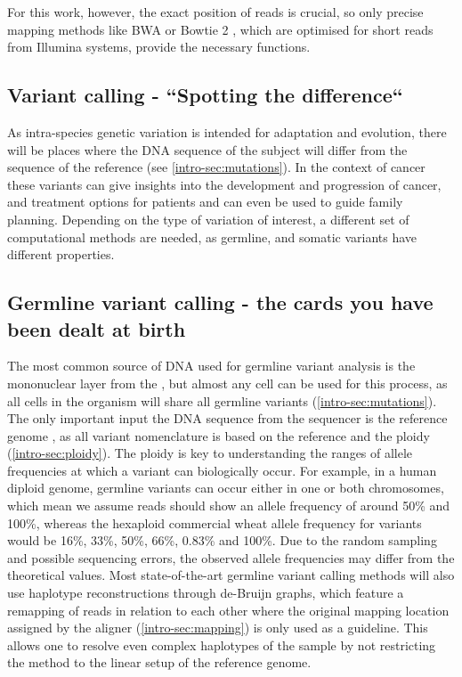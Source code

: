 For this work, however, the exact position of reads is crucial, so only precise mapping methods like BWA \cite{Li2013} or Bowtie 2 \cite{Langmead2018}, which are optimised for short reads from Illumina systems, provide the necessary functions.


\subsection[Variant calling]{Variant calling - ``Spotting the difference``}
\label{intro-sec:variantcalling}
As intra-species genetic variation is intended for adaptation and evolution, there will be places where the DNA sequence of the subject will differ from the sequence of the reference (see \autoref{intro-sec:mutations}). In the context of cancer these variants can give insights into the development and progression of cancer, and treatment options for patients and can even be used to guide family planning. Depending on the type of variation  of interest, a different set of computational methods are needed, as germline, and somatic variants have different properties.

\subsection[Germline]{Germline variant calling - the cards you have been dealt at birth}
\label{intro-sec:germlinecalling}
The most common source of DNA used for germline variant analysis is the mononuclear layer from the , but  almost any cell can be used for this process, as all cells in the organism will share all germline variants (\autoref{intro-sec:mutations}). The only important input  the DNA sequence from the sequencer is the  reference genome , as all variant nomenclature is based on the reference and the ploidy  (\autoref{intro-sec:ploidy}). The ploidy is key to understanding the ranges of allele frequencies at which a variant can biologically occur. For example, in a human diploid genome, germline variants can occur either in one or both chromosomes, which mean we assume reads should show an allele frequency of around 50\% and 100\%, whereas the hexaploid commercial wheat \cite{Mayer2014} allele frequency for variants would be 16\%, 33\%, 50\%, 66\%, 0.83\% and 100\%. Due to the random sampling and possible sequencing errors, the observed allele frequencies may differ from the theoretical values. 
Most state-of-the-art germline variant calling methods will also use haplotype reconstructions through de-Bruijn graphs, which feature a remapping of reads in relation to each other \cite{Garrison2012,Lai2016,Kim2018,Benjamin2019,Cooke2021} where the original mapping location assigned by the aligner (\autoref{intro-sec:mapping}) is only used as a guideline. This  allows one to resolve even complex haplotypes of the sample by not restricting the method to the linear setup of the reference genome.


